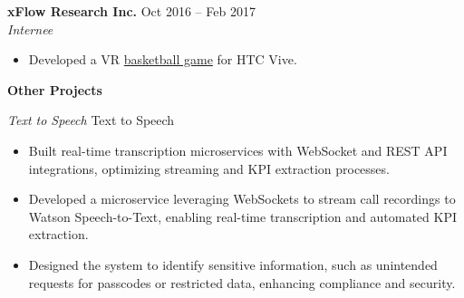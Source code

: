 \documentclass{res} %
\newcommand{\Section}[1]{%
  \vspace{8pt}%
  \begin{center}
    {\bfseries #1}
  \end{center}
  \vspace{2pt}%
}
\begin{document}
\begin{resume}
  \textbf{xFlow Research Inc.} \hfill Oct 2016 -- Feb 2017\\
  {\sl Internee} \smallskip
  \begin{itemize}
    \item Developed a VR \href{https://github.com/sohail0992/basketBallGame}{basketball game} for HTC Vive.  
   
  \end{itemize}
\Section{Other Projects}
  {\sl  Text to Speech} \smallskip
  Text to Speech
  \begin{itemize} \smallskip
    \item Built real-time transcription microservices with WebSocket and REST API integrations, optimizing streaming and KPI extraction processes.
    \item Developed a microservice leveraging WebSockets to stream call recordings to Watson Speech-to-Text, enabling real-time transcription and automated KPI extraction.
    \item Designed the system to identify sensitive information, such as unintended requests for passcodes or restricted data, enhancing compliance and security.


\end{itemize}
\end{resume}
\end{document}
